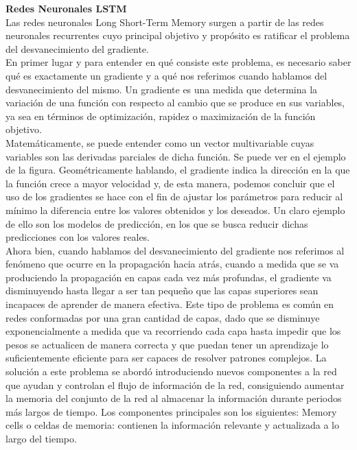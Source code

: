 \textbf{Redes Neuronales LSTM} \\

Las redes neuronales Long Short-Term Memory surgen a partir de las redes neuronales recurrentes cuyo principal objetivo y propósito es ratificar el problema del desvanecimiento del gradiente. \\

En primer lugar y para entender en qué consiste este problema, es necesario saber qué es exactamente un gradiente y a qué nos referimos cuando hablamos del desvanecimiento del mismo. Un gradiente es una medida que determina la variación de una función con respecto al cambio que se produce en sus variables, ya sea en términos de optimización, rapidez o maximización de la función objetivo. \\

Matemáticamente, se puede entender como un vector multivariable cuyas variables son las derivadas parciales de dicha función. Se puede ver en el ejemplo de la figura. Geométricamente hablando, el gradiente indica la dirección en la que la función crece a mayor velocidad y, de esta manera, podemos concluir que el uso de los gradientes se hace con el fin de ajustar los parámetros para reducir al mínimo la diferencia entre los valores obtenidos y los deseados. Un claro ejemplo de ello son los modelos de predicción, en los que se busca reducir dichas predicciones con los valores reales. \\

Ahora bien, cuando hablamos del desvanecimiento del gradiente nos referimos al fenómeno que ocurre en la propagación hacia atrás, cuando a medida que se va produciendo la propagación en capas cada vez más profundas, el gradiente va disminuyendo hasta llegar a ser tan pequeño que las capas superiores sean incapaces de aprender de manera efectiva. Este tipo de problema es común en redes conformadas por una gran cantidad de capas, dado que se disminuye exponencialmente a medida que va recorriendo cada capa hasta impedir que los pesos se actualicen de manera correcta y que puedan tener un aprendizaje lo suficientemente eficiente para ser capaces de resolver patrones complejos.
La solución a este problema se abordó introduciendo nuevos componentes a la red que ayudan y controlan el flujo de información de la red, consiguiendo aumentar la memoria del conjunto de la red al almacenar la información durante periodos más largos de tiempo. Los componentes principales son los siguientes:
Memory cells o celdas de memoria: contienen la información relevante  y actualizada a lo largo del tiempo.\\ 

